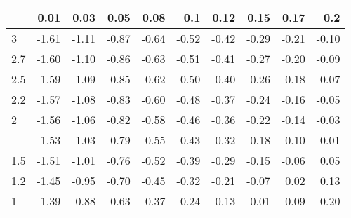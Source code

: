 
\begin{tabular}{lrrrrrrrrr}
\toprule
  & 0.01 & 0.03 & 0.05 & 0.08 & 0.1 & 0.12 & 0.15 & 0.17 & 0.2\\
\midrule
3 & -1.61 & -1.11 & -0.87 & -0.64 & -0.52 & -0.42 & -0.29 & -0.21 & -0.10\\
2.7 & -1.60 & -1.10 & -0.86 & -0.63 & -0.51 & -0.41 & -0.27 & -0.20 & -0.09\\
2.5 & -1.59 & -1.09 & -0.85 & -0.62 & -0.50 & -0.40 & -0.26 & -0.18 & -0.07\\
2.2 & -1.57 & -1.08 & -0.83 & -0.60 & -0.48 & -0.37 & -0.24 & -0.16 & -0.05\\
2 & -1.56 & -1.06 & -0.82 & -0.58 & -0.46 & -0.36 & -0.22 & -0.14 & -0.03\\
\addlinespace
1.7 & -1.53 & -1.03 & -0.79 & -0.55 & -0.43 & -0.32 & -0.18 & -0.10 & 0.01\\
1.5 & -1.51 & -1.01 & -0.76 & -0.52 & -0.39 & -0.29 & -0.15 & -0.06 & 0.05\\
1.2 & -1.45 & -0.95 & -0.70 & -0.45 & -0.32 & -0.21 & -0.07 & 0.02 & 0.13\\
1 & -1.39 & -0.88 & -0.63 & -0.37 & -0.24 & -0.13 & 0.01 & 0.09 & 0.20\\
\bottomrule
\end{tabular}
